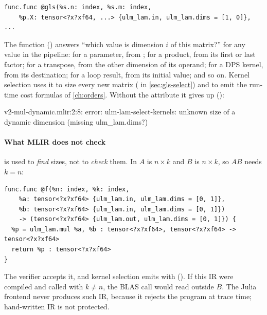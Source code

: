 \begin{lstlisting}
func.func @gls(%s.n: index, %s.m: index,
    %p.X: tensor<?x?xf64, ...> {ulm_lam.in, ulm_lam.dims = [1, 0]}, ...
\end{lstlisting}

The function  ()
answers ``which  value is dimension \(i\) of this matrix?'' for
any value in the pipeline: for a parameter, from ; for a
product, from its first or last factor; for a transpose, from the other
dimension of its operand; for a DPS kernel, from its destination; for a
loop result, from its initial value; and so on. Kernel selection uses it to
size every new matrix ( in
\cref{sec:gls-select}) and to emit the run-time cost formulas of
\cref{ch:orders}. Without the attribute it gives up ():

\begin{textout}
v2-mul-dynamic.mlir:2:8: error: ulm-lam-select-kernels: unknown size of a dynamic dimension (missing ulm_lam.dims?)
\end{textout}

\paragraph{What MLIR does not check}  is used to
\emph{find} sizes, not to \emph{check} them. In 
\(A\) is \(n\times k\) and \(B\) is \(n\times k\), so \(AB\) needs \(k=n\):

\begin{lstlisting}
func.func @f(%n: index, %k: index,
    %a: tensor<?x?xf64> {ulm_lam.in, ulm_lam.dims = [0, 1]},
    %b: tensor<?x?xf64> {ulm_lam.in, ulm_lam.dims = [0, 1]})
    -> (tensor<?x?xf64> {ulm_lam.out, ulm_lam.dims = [0, 1]}) {
  %p = ulm_lam.mul %a, %b : tensor<?x?xf64>, tensor<?x?xf64> -> tensor<?x?xf64>
  return %p : tensor<?x?xf64>
}
\end{lstlisting}

The verifier accepts it, and kernel selection emits
 with
 (). If
this IR were compiled and called with \(k \ne n\), the BLAS call would read
outside \(B\). The Julia frontend never produces such IR, because it
rejects the program at trace time; hand-written IR is not protected.

